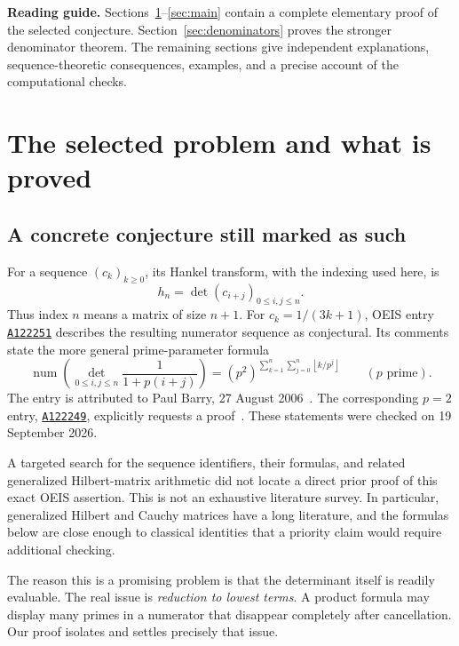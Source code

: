 \documentclass[11pt,a4paper]{article}
\numberwithin{equation}{section}
\theoremstyle{definition}
\theoremstyle{remark}
\newcommand{\num}{\operatorname{num}}
\newcommand{\floor}[1]{\left\lfloor#1\right\rfloor}
\newcommand{\OEIS}[1]{\href{https://oeis.org/#1}{\texttt{#1}}}
\begin{document}
\tableofcontents
\vspace{5mm}
\begin{resultbox}
\textbf{Reading guide.} Sections~\ref{sec:problem}--\ref{sec:main} contain a complete elementary proof of the selected conjecture. Section~\ref{sec:denominators} proves the stronger denominator theorem. The remaining sections give independent explanations, sequence-theoretic consequences, examples, and a precise account of the computational checks.
\end{resultbox}
\newpage
{}

\section{The selected problem and what is proved}\label{sec:problem}

\subsection{A concrete conjecture still marked as such}
For a sequence $(c_k)_{k\geq0}$, its Hankel transform, with the indexing used here, is
\[
 h_n=\det(c_{i+j})_{0\leq i,j\leq n}.
\]
Thus index $n$ means a matrix of size $n+1$. For $c_k=1/(3k+1)$, OEIS entry \OEIS{A122251} describes the resulting numerator sequence as conjectural. Its comments state the more general prime-parameter formula
\begin{equation}\label{eq:original}
 \num\left(\det_{0\leq i,j\leq n}\frac1{1+p(i+j)}\right)
 =(p^2)^{\displaystyle\sum_{k=1}^n\sum_{j=0}^n\floor{k/p^j}}
 \qquad(p\text{ prime}).
\end{equation}
The entry is attributed to Paul Barry, 27 August 2006~\cite{oeis251}. The corresponding $p=2$ entry, \OEIS{A122249}, explicitly requests a proof~\cite{oeis249}. These statements were checked on 19 September 2026.

A targeted search for the sequence identifiers, their formulas, and related generalized Hilbert-matrix arithmetic did not locate a direct prior proof of this exact OEIS assertion. This is not an exhaustive literature survey. In particular, generalized Hilbert and Cauchy matrices have a long literature, and the formulas below are close enough to classical identities that a priority claim would require additional checking.

The reason this is a promising problem is that the determinant itself is readily evaluable. The real issue is \emph{reduction to lowest terms}. A product formula may display many primes in a numerator that disappear completely after cancellation. Our proof isolates and settles precisely that issue.
\end{document}
